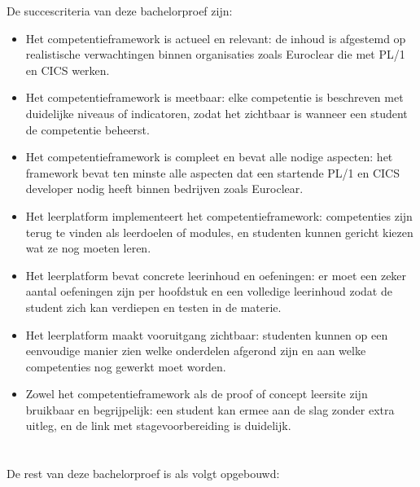 De succescriteria van deze bachelorproef zijn:
\begin{itemize}
    \item Het competentieframework is actueel en relevant: de inhoud is afgestemd op realistische verwachtingen binnen organisaties zoals Euroclear die met PL/1 en CICS werken.
    \item Het competentieframework is meetbaar: elke competentie is beschreven met duidelijke niveaus of indicatoren, zodat het zichtbaar is wanneer een student de competentie beheerst.
    \item Het competentieframework is compleet en bevat alle nodige aspecten: het framework bevat ten minste alle aspecten dat een startende PL/1 en CICS developer nodig heeft binnen bedrijven zoals Euroclear.
    \item Het leerplatform implementeert het competentieframework: competenties zijn terug te vinden als leerdoelen of modules, en studenten kunnen gericht kiezen wat ze nog moeten leren.
    \item Het leerplatform bevat concrete leerinhoud en oefeningen: er moet een zeker aantal oefeningen zijn per hoofdstuk en een volledige leerinhoud zodat de student zich kan verdiepen en testen in de materie.
    \item Het leerplatform maakt vooruitgang zichtbaar: studenten kunnen op een eenvoudige manier zien welke onderdelen afgerond zijn en aan welke competenties nog gewerkt moet worden.
    \item Zowel het competentieframework als de proof of concept leersite zijn bruikbaar en begrijpelijk: een student kan ermee aan de slag zonder extra uitleg, en de link met stagevoorbereiding is duidelijk.
\end{itemize}




\section{}%
\label{sec:opzet-bachelorproef}





De rest van deze bachelorproef is als volgt opgebouwd:

